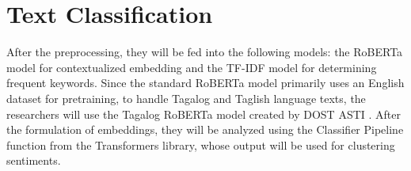 \section{Text Classification}
After the preprocessing, they will be fed into the following models: the RoBERTa model for contextualized embedding and the TF-IDF model for determining frequent keywords. Since the standard RoBERTa model primarily uses an English dataset for pretraining, to handle Tagalog and Taglish language texts, the researchers will use the Tagalog RoBERTa model created by \textsc{DOST ASTI} \cite{MTHD_RoBERTa-model}. After the formulation of embeddings, they will be analyzed using the Classifier Pipeline function from the Transformers library, whose output will be used for clustering sentiments.